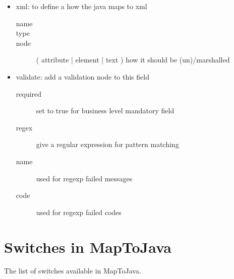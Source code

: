 \begin{itemize}
\item{xml}: to define a how the java maps to xml
\begin{description}
    \item[name]
    \item[type]
    \item[node]  ( attribute | element | text ) how it should be (un)/marshalled
\end{description}
\item{validate}: add a validation node to this field
\begin{description}
	\item[required] set to true for business level mandatory field
	\item[regex] give a regular expression for pattern matching
	\item[name] used for regexp failed messages
	\item[code] used for regexp failed codes
\end{description}
\end{itemize}


\section{Switches in MapToJava}
The list of switches available in MapToJava. 

